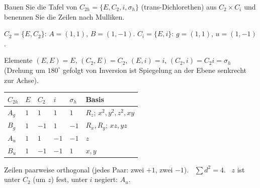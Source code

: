 \begin{aufgabe}
Bauen Sie die Tafel von $C_{2h} = \{E, C_2, i, \sigma_h\}$ (trans-Dichlorethen) aus $C_2\times C_i$ und benennen Sie die Zeilen nach Mulliken.

\loesung
{}
$C_2 = \{E, C_2\}$: $A = (1, 1)$, $B = (1, -1)$. $C_i = \{E, i\}$: $g = (1, 1)$, $u = (1, -1)$.

Elemente $(E, E) = E$, $(C_2, E) = C_2$, $(E, i) = i$, $(C_2, i) = C_2i = \sigma_h$ (Drehung um $180^{\circ}$ gefolgt von Inversion ist Spiegelung an der Ebene senkrecht zur Achse).
\begin{center}
{\small
\renewcommand{\arraystretch}{1.46}
\begin{tabular}{@{}P{1.0cm}P{0.7cm}P{0.8cm}P{0.7cm}P{0.8cm}P{3.0cm}@{}}
\toprule
$C_{2h}$ & $E$ & $C_2$ & $i$ & $\sigma_h$ & \textbf{Basis}\\
\midrule
$A_g$ & $1$ & $1$ & $1$ & $1$ & $R_z$; $x^{2}, y^{2}, z^{2}, xy$\\
$B_g$ & $1$ & $-1$ & $1$ & $-1$ & $R_x, R_y$; $xz, yz$\\
$A_u$ & $1$ & $1$ & $-1$ & $-1$ & $z$\\
$B_u$ & $1$ & $-1$ & $-1$ & $1$ & $x, y$\\
\bottomrule
\end{tabular}}
\end{center}

Zeilen paarweise orthogonal (jedes Paar: zwei $+1$, zwei $-1$). \checkmark\ $\sum d^{2} = 4$. \checkmark\ $z$ ist unter $C_2$ (um $z$) fest, unter $i$ negiert: $A_u$. \checkmark

\begin{center}
\begin{minipage}{0.88\textwidth}
\end{minipage}
\end{center}
\end{aufgabe}

